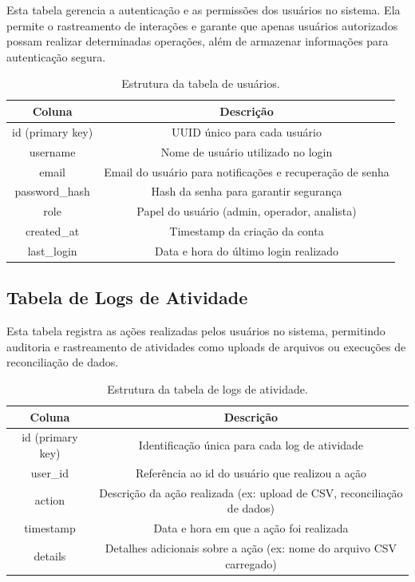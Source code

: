 Esta tabela gerencia a autenticação e as permissões dos usuários no sistema. Ela permite o rastreamento de interações e garante que apenas usuários autorizados possam realizar determinadas operações, além de armazenar informações para autenticação segura.

\begin{table}[htbp]
    \centering
    \caption{Estrutura da tabela de usuários.}
    \label{Tab:Users}
    \begin{tabular}{|c|c|}
        \hline
        \textbf{Coluna} & \textbf{Descrição} \\ \hline
        id (primary key) & UUID único para cada usuário \\ \hline
        username & Nome de usuário utilizado no login \\ \hline
        email & Email do usuário para notificações e recuperação de senha \\ \hline
        password\_hash & Hash da senha para garantir segurança \\ \hline
        role & Papel do usuário (admin, operador, analista) \\ \hline
        created\_at & Timestamp da criação da conta \\ \hline
        last\_login & Data e hora do último login realizado \\ \hline
    \end{tabular}
\end{table}

\subsection{Tabela de Logs de Atividade}

Esta tabela registra as ações realizadas pelos usuários no sistema, permitindo auditoria e rastreamento de atividades como uploads de arquivos ou execuções de reconciliação de dados.

\begin{table}[htbp]
    \centering
    \caption{Estrutura da tabela de logs de atividade.}
    \label{Tab:ActivityLogs}
    \begin{tabular}{|c|c|}
        \hline
        \textbf{Coluna} & \textbf{Descrição} \\ \hline
        id (primary key) & Identificação única para cada log de atividade \\ \hline
        user\_id & Referência ao id do usuário que realizou a ação \\ \hline
        action & Descrição da ação realizada (ex: upload de CSV, reconciliação de dados) \\ \hline
        timestamp & Data e hora em que a ação foi realizada \\ \hline
        details & Detalhes adicionais sobre a ação (ex: nome do arquivo CSV carregado) \\ \hline
    \end{tabular}
\end{table}

